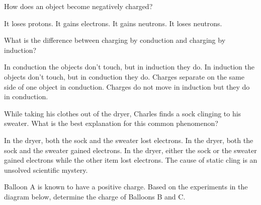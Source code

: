 \documentclass[]{exam}
\begin{document}
\begin{questions}
\question
How does an object become negatively charged?

\begin{randomizechoices}
    \choice It loses protons.
    \correctchoice It gains electrons.
    \choice It gains neutrons.
    \choice It loses neutrons.
\end{randomizechoices}

\question
What is the difference between charging by conduction and charging by induction?

\begin{randomizechoices}
    \choice In conduction the objects don't touch, but in induction they do.
    \correctchoice In induction the objects don't touch, but in conduction they do.
    \choice Charges separate on the same side of one object in conduction.
    \choice Charges do not move in induction but they do in conduction.
\end{randomizechoices}

\question
While taking his clothes out of the dryer, Charles finds a sock clinging to his sweater. What is the best explanation for this common phenomenon? 

\begin{randomizechoices}[keeplast]
    \choice In the dryer, both the sock and the sweater lost electrons.
    \choice In the dryer, both the sock and the sweater gained electrons.
    \correctchoice In the dryer, either the sock or the sweater gained electrons while the other item lost electrons.
    \choice The cause of static cling is an unsolved scientific mystery.
\end{randomizechoices}

\question
Balloon A is known to have a positive charge.  Based on the experiments in the diagram below, determine the charge of Balloons B and C.

\begin{center}
\hspace{1cm}
\end{center}


\end{questions}
\end{document}
